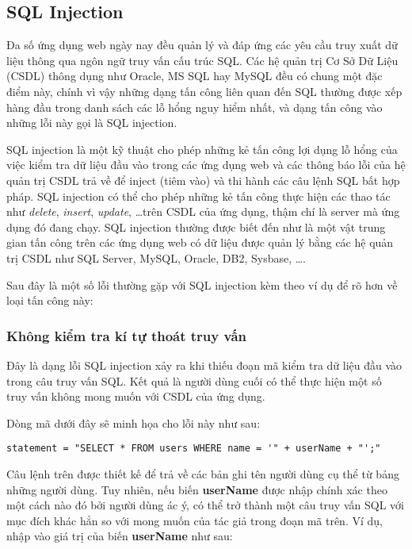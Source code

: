 \documentclass[../main-report.tex]{subfiles}
\begin{document}
\subsection{SQL Injection}
Đa số ứng dụng web ngày nay đều quản lý và đáp ứng các yêu cầu truy xuất dữ liệu
thông qua ngôn ngữ truy vấn cấu trúc SQL. Các hệ quản trị Cơ Sở Dữ Liệu (CSDL) thông dụng
như Oracle, MS SQL hay MySQL đều có chung một đặc điểm này, chính vì vậy những
dạng tấn công liên quan đến SQL thường được xếp hàng đầu trong danh sách các lỗ hổng nguy hiểm nhất, và dạng tấn công vào những lỗi này gọi là SQL injection.

SQL injection là một kỹ thuật cho phép những kẻ tấn công lợi dụng lỗ hổng của việc kiểm tra dữ liệu đầu vào trong các ứng dụng web và các thông báo lỗi của hệ quản trị CSDL trả về để inject (tiêm vào) và thi hành các câu lệnh SQL bất hợp pháp. SQL injection có thể cho phép những kẻ tấn công thực hiện các thao tác như \emph{delete}, \emph{insert}, \emph{update}, \ldots trên CSDL của ứng dụng, thậm chí là server mà ứng dụng đó đang chạy. SQL injection thường được biết đến như là một vật trung gian tấn công trên các ứng dụng web có dữ liệu được quản lý bằng các hệ quản trị CSDL như SQL Server, MySQL, Oracle, DB2, Sysbase, \ldots.

Sau đây là một số lỗi thường gặp với SQL injection kèm theo ví dụ để rõ hơn về loại tấn công này:

\subsubsection*{Không kiểm tra kí tự thoát truy vấn}
Đây là dạng lỗi SQL injection xảy ra khi thiếu đoạn mã kiểm tra dữ liệu đầu vào trong câu truy vấn SQL. Kết quả là người dùng cuối có thể thực hiện một số truy vấn không mong muốn với CSDL của ứng dụng.

\begin{example}
Dòng mã dưới đây sẽ minh họa cho lỗi này như sau:

\begin{lstlisting}
statement = "SELECT * FROM users WHERE name = '" + userName + "';"
\end{lstlisting}
\end{example}

Câu lệnh trên được thiết kế để trả về các bản ghi tên người dùng cụ thể từ bảng những người dùng. Tuy nhiên, nếu biến \textbf{userName} được nhập chính xác theo một cách nào đó bởi người dùng ác ý, có thể trở thành một câu truy vấn SQL với mục đích khác hẳn so với mong muốn của tác giả trong đoạn mã trên. Ví dụ, nhập vào giá trị của biến \textbf{userName} như sau:
\end{document}
